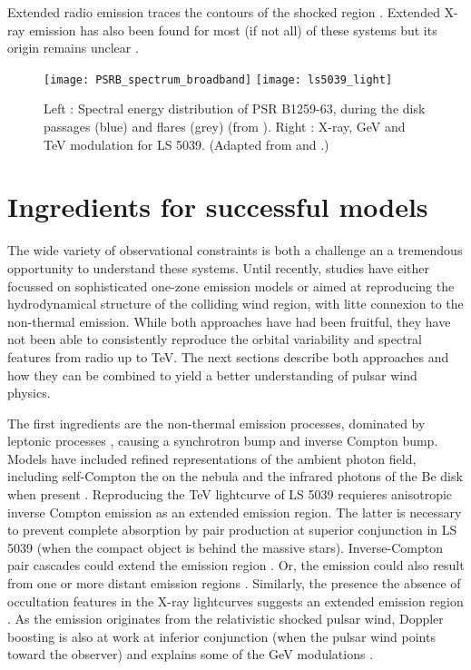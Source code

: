 Extended radio emission traces the contours of the shocked region \citep{2006smqw.confE..52D,2011ApJ...732L..10M}. Extended X-ray emission has also been found for most (if not all) of these systems but its origin remains unclear  \citep{2014AN....335..301K}. 


\begin{figure}
  \centering
  \texttt{[image: PSRB\_spectrum\_broadband]}
\texttt{[image: ls5039\_light]}
  \caption{Left : Spectral energy distribution of PSR B1259-63, during the disk passages (blue) and flares (grey) (from \citet{2015MNRAS.454.1358C} ). Right : X-ray, GeV and TeV modulation for LS 5039. (Adapted from \citet{2009ApJ...697L...1K,2009ApJ...706L..56A} and \citet{2006A&A...460..743A} .)}
  \label{fig:obs}
\end{figure}


\section { Ingredients for successful models}


The wide variety of observational constraints is both a challenge an a tremendous opportunity to understand these systems.  Until recently, studies have either focussed on sophisticated one-zone emission models or aimed at reproducing the hydrodynamical  structure of the colliding wind region, with litte connexion to the non-thermal emission. While both approaches have had been fruitful, they have not been able to consistently reproduce the  orbital variability and spectral features from radio up to TeV.   The next sections describe both approaches and how they can be combined to yield a better understanding of pulsar wind physics.

The first ingredients are the non-thermal emission processes, dominated by leptonic processes \citep{2006A&A...456..801D}, causing a synchrotron bump and inverse Compton bump.  Models have included refined  representations of the ambient photon field, including self-Compton the on the nebula  \citep{2010A&A...519A..81C} and the infrared photons of the  Be disk when present  \citep{2012MNRAS.426.3135V}. Reproducing the TeV lightcurve of LS 5039 requieres anisotropic inverse Compton emission  \citep{2008A&A...477..691D} as an extended emission region. The latter is necessary to prevent complete absorption by pair production at  superior conjunction in LS 5039 (when the compact object is behind the massive stars).  Inverse-Compton pair cascades could extend the emission region \citep{2006MNRAS.371.1737B,2010A&A...519A..81C}. Or, the  emission could also result from one or more  distant emission regions \citep{2013A&A...551A..17Z}.  Similarly, the presence the absence of occultation features in the X-ray lightcurves suggests an extended emission region \citep{2007A&A...473..545B,2011MNRAS.411..193S}.  As the emission originates from the relativistic shocked pulsar wind, Doppler boosting is also at work at inferior conjunction (when the pulsar wind points toward the observer) and explains some of the GeV modulations \citep{2010A&A...516A..18D}. 

